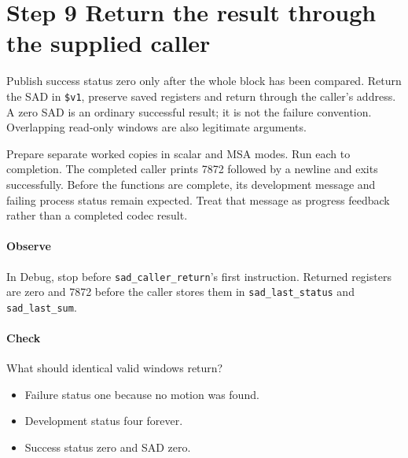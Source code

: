 \section{Step 9 Return the result through the supplied caller}\label{h263-sad-s09}
Publish success status zero only after the whole block has been compared. Return
the SAD in \texttt{\$v1}, preserve saved registers and return through the caller's
address. A zero SAD is an ordinary successful result; it is not the failure
convention. Overlapping read-only windows are also legitimate arguments.

Prepare separate worked copies in scalar and MSA modes. Run each to completion.
The completed caller prints 7872 followed by a newline and exits successfully.
Before the functions are complete, its development message and failing process
status remain expected. Treat that message as progress feedback rather than a
completed codec result.

\paragraph{Observe} In Debug, stop before \texttt{sad\_caller\_return}'s first
instruction. Returned registers are zero and 7872 before the caller stores them
in \texttt{sad\_last\_status} and \texttt{sad\_last\_sum}.
\paragraph{Check} What should identical valid windows return?
\begin{itemize}
  \item[A.] Failure status one because no motion was found.
  \item[B.] Development status four forever.
  \item[C.] Success status zero and SAD zero.
\end{itemize}

